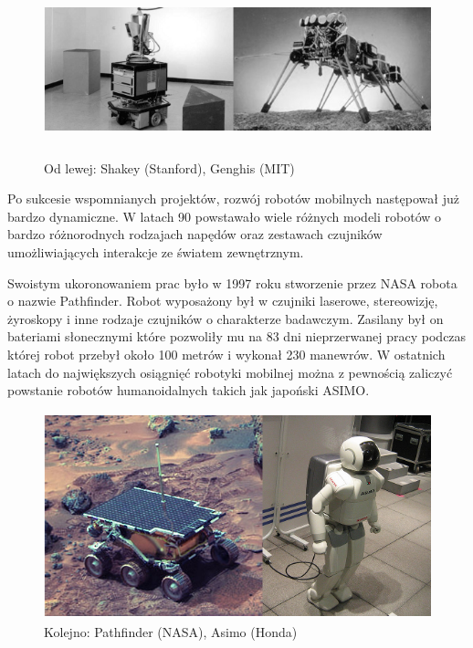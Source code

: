 \begin{figure}[h!]
 \centering
 \includegraphics[height=50mm]{../images/ch01/shakey_and_genghis.png}
 \caption{Od lewej: Shakey (Stanford), Genghis (MIT) }
 \label{fig:RobotsHistory_Shakey_Genghis}
\end{figure}

Po sukcesie wspomnianych projektów, rozwój robotów mobilnych następował już
bardzo dynamiczne. W latach 90 powstawało wiele różnych modeli robotów o bardzo
różnorodnych rodzajach napędów oraz zestawach czujników umożliwiających
interakcje ze światem zewnętrznym.

Swoistym ukoronowaniem prac było w 1997 roku stworzenie przez NASA robota o
nazwie Pathfinder. Robot wyposażony był w czujniki laserowe, stereowizję,
żyroskopy i inne rodzaje czujników o charakterze badawczym. Zasilany był on
bateriami słonecznymi które pozwoliły mu na 83 dni nieprzerwanej pracy podczas
której robot przebył około 100 metrów i wykonał 230 manewrów. W ostatnich
latach do największych osiągnięć robotyki mobilnej można z pewnością zaliczyć
powstanie robotów humanoidalnych takich jak japoński ASIMO. 

\begin{figure}[h!]
 \centering
 \includegraphics[height=60mm]{../images/ch01/pathfinder_and_asimo.png}
 \caption{Kolejno: Pathfinder (NASA), Asimo (Honda)}
 \label{fig:RobotsHistory_Pathfinder_Asimo}
\end{figure}

